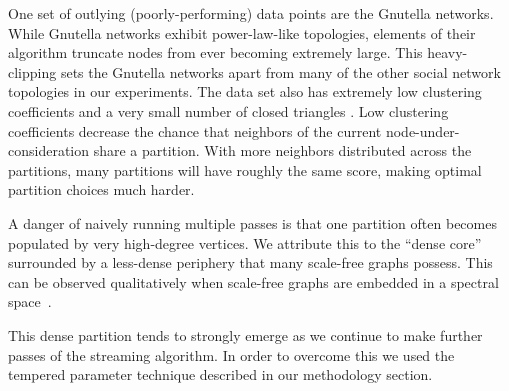 
One set of outlying (poorly-performing) data points are the Gnutella networks.
While Gnutella networks exhibit power-law-like topologies, elements of their algorithm truncate nodes from ever becoming extremely large. 
This heavy-clipping sets the Gnutella networks apart from many of the other social network topologies in our experiments.
The data set also has extremely low clustering coefficients and a very small number of closed triangles \cite{Ripeanu:2002:MGN:613352.613670}. 
Low clustering coefficients decrease the chance that neighbors of the current node-under-consideration share a partition. 
With more neighbors distributed across the partitions, many partitions will have roughly the same score, making optimal partition choices much harder.

A danger of naively running multiple passes is that one partition often becomes populated by very high-degree vertices. 
We attribute this to the ``dense core'' surrounded by a less-dense periphery that many scale-free graphs possess.
This can be observed qualitatively when scale-free graphs are embedded in a spectral space~\cite{Lang04findinggood}.

This dense partition tends to strongly emerge as we continue to make further passes of the streaming algorithm.
In order to overcome this we used the tempered parameter technique described in our methodology section. 


